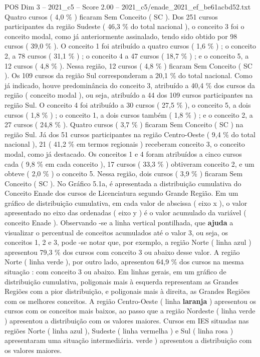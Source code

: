 \begin{textsample}{POS Dim 3 – 2021\_c5 – Score 2.00 – 2021\_c5/enade\_2021\_ef\_be61acbd52.txt}
Quatro cursos ( 4,0 \% ) ficaram Sem Conceito ( SC ).
Dos 251 cursos participantes da região Sudeste ( 46,3 \% do total nacional ), o conceito 3 foi o conceito modal, como já anteriormente assinalado, tendo sido obtido por 98 cursos ( 39,0 \% ).
O conceito 1 foi atribuído a quatro cursos ( 1,6 \% ) ; o conceito 2, a 78 cursos ( 31,1 \% ) ; o conceito 4 a 47 cursos ( 18,7 \% ) ; e o conceito 5, a 12 cursos ( 4,8 \% ).
Nessa região, 12 cursos ( 4,8 \% ) ficaram Sem Conceito ( SC ).
Os 109 cursos da região Sul corresponderam a 20,1 \% do total nacional.
Como já indicado, houve predominância do conceito 3, atribuído a 40,4 \% dos cursos da região ( conceito modal ), ou seja, atribuído a 44 dos 109 cursos participantes na região Sul.
O conceito 4 foi atribuído a 30 cursos ( 27,5 \% ), o conceito 5, a dois cursos ( 1,8 \% ) ; o conceito 1, a dois cursos também ( 1,8 \% ) ; e o conceito 2, a 27 cursos ( 24,8 \% ).
Quatro cursos ( 3,7 \% ) ficaram Sem Conceito ( SC ) na região Sul.
Já dos 51 cursos participantes na região Centro-Oeste ( 9,4 \% do total nacional ), 21 ( 41,2 \% em termos regionais ) receberam conceito 3, o conceito modal, como já destacado.
Os conceitos 1 e 4 foram atribuídos a cinco cursos cada ( 9,8 \% em cada conceito ), 17 cursos ( 33,3 \% ) obtiveram conceito 2, e um obteve ( 2,0 \% ) o conceito 5.
Nessa região, dois cursos ( 3,9 \% ) ficaram Sem Conceito ( SC ).
No Gráfico 5.1a, é apresentada a distribuição cumulativa do Conceito Enade dos cursos de Licenciatura segundo Grande Região.
Em um gráfico de distribuição cumulativa, em cada valor de abscissa ( eixo x ), o valor apresentado no eixo das ordenadas ( eixo y ) é o valor acumulado da variável ( conceito Enade ).
Observando -se a linha vertical pontilhada, que \textbf{ajuda} a visualizar o percentual de conceitos acumulados até o valor 3, ou seja, os conceitos 1, 2 e 3, pode -se notar que, por exemplo, a região Norte ( linha azul ) apresentou 79,3 \% dos cursos com conceito 3 ou abaixo desse valor.
A região Norte ( linha verde ), por outro lado, apresentou 64,9 \% dos cursos na mesma situação : com conceito 3 ou abaixo.
Em linhas gerais, em um gráfico de distribuição cumulativa, poligonais mais à esquerda representam as Grandes Regiões com a pior distribuição, e poligonais mais à direita, as Grandes Regiões com os melhores conceitos.
A região Centro-Oeste ( linha \textbf{laranja} ) apresentou os cursos com os conceitos mais baixos, ao passo que a região Nordeste ( linha verde ) apresentou a distribuição com os valores maiores.
Cursos em IES situadas nas regiões Norte ( linha azul ), Sudeste ( linha vermelha ) e Sul ( linha rosa ) apresentaram uma situação intermediária. verde ) apresentou a distribuição com os valores maiores.

\end{textsample}
